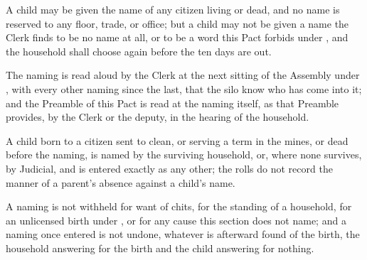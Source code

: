 \begin{clauses}
\item A child may be given the name of any citizen living or dead, and no name is reserved to any floor, trade, or office; but a child may not be given a name the Clerk finds to be no name at all, or to be a word this Pact forbids under , and the household shall choose again before the ten days are out.
\item The naming is read aloud by the Clerk at the next sitting of the Assembly under , with every other naming since the last, that the silo know who has come into it; and the Preamble of this Pact is read at the naming itself, as that Preamble provides, by the Clerk or the deputy, in the hearing of the household.
\item A child born to a citizen sent to clean, or serving a term in the mines, or dead before the naming, is named by the surviving household, or, where none survives, by Judicial, and is entered exactly as any other; the rolls do not record the manner of a parent's absence against a child's name.
\item A naming is not withheld for want of chits, for the standing of a household, for an unlicensed birth under , or for any cause this section does not name; and a naming once entered is not undone, whatever is afterward found of the birth, the household answering for the birth and the child answering for nothing.
\end{clauses}

